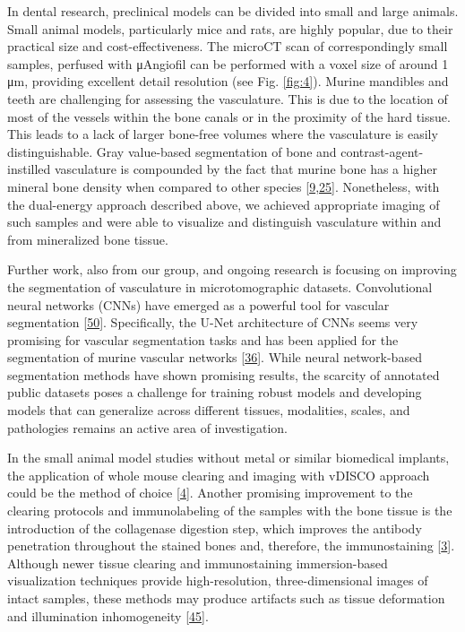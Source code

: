 In dental research, preclinical models can be divided into small and large animals.
Small animal models, particularly mice and rats, are highly popular, due to their practical size and cost-effectiveness.
The microCT scan of correspondingly small samples, perfused with μAngiofil can be performed with a voxel size of around 1 μm, providing excellent detail resolution (see Fig. \ref{fig:4}).
Murine mandibles and teeth are challenging for assessing the vasculature.
This is due to the location of most of the vessels within the bone canals or in the proximity of the hard tissue.
This leads to a lack of larger bone-free volumes where the vasculature is easily distinguishable.
Gray value-based segmentation of bone and contrast-agent-instilled vasculature is compounded by the fact that murine bone has a higher mineral bone density when compared to other species {[}\protect\hyperlink{ref-FXSWRzX2}{9},\protect\hyperlink{ref-1AEVcopFo}{25}{]}.
Nonetheless, with the dual-energy approach described above, we achieved appropriate imaging of such samples and were able to visualize and distinguish vasculature within and from mineralized bone tissue.

Further work, also from our group, and ongoing research is focusing on improving the segmentation of vasculature in microtomographic datasets.
Convolutional neural networks (CNNs) have emerged as a powerful tool for vascular segmentation {[}\protect\hyperlink{ref-HNrZh8S1}{50}{]}.
Specifically, the U-Net architecture of CNNs seems very promising for vascular segmentation tasks and has been applied for the segmentation of murine vascular networks {[}\protect\hyperlink{ref-mbgAp0y8}{36}{]}.
While neural network-based segmentation methods have shown promising results, the scarcity of annotated public datasets poses a challenge for training robust models and developing models that can generalize across different tissues, modalities, scales, and pathologies remains an active area of investigation.

In the small animal model studies without metal or similar biomedical implants, the application of whole mouse clearing and imaging with vDISCO approach could be the method of choice {[}\protect\hyperlink{ref-BNZSaEBe}{4}{]}.
Another promising improvement to the clearing protocols and immunolabeling of the samples with the bone tissue is the introduction of the collagenase digestion step, which improves the antibody penetration throughout the stained bones and, therefore, the immunostaining {[}\protect\hyperlink{ref-ZGzobRpX}{3}{]}.
Although newer tissue clearing and immunostaining immersion-based visualization techniques provide high-resolution, three-dimensional images of intact samples, these methods may produce artifacts such as tissue deformation and illumination inhomogeneity {[}\protect\hyperlink{ref-yP3RkDdM}{45}{]}.

